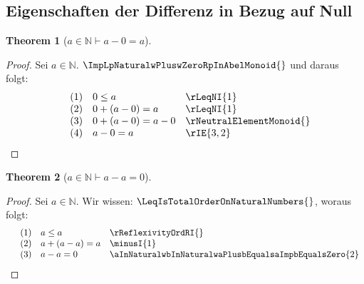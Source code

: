 \documentclass{book}
\theoremstyle{plain}
\newtheorem{theorem}{Theorem}
\theoremstyle{remark}
\theoremstyle{definition}
\begin{document}
\subsection{Eigenschaften der Differenz in Bezug auf Null}

\label{aInNaturalImpaMinusZeroEqualsa}
\begin{theorem}[\(a\in\mathbb{N}\vdash a-0=a\)]
\end{theorem}
\begin{proof}
    Sei \(a\in\mathbb{N}\). \(\ImpLpNaturalwPluswZeroRpInAbelMonoid{}\) und daraus folgt:
        \[
	\begin{array}{llll}
            &  (1) & 0\leq a & \rLeqNI{1} \\
            &  (2) & 0+(a-0)=a & \rLeqNI{1} \\
            &  (3) & 0+(a-0)=a-0 & \rNeutralElementMonoid{} \\
            &  (4) & a-0=a & \rIE{3,2} \\
    \end{array}
	\]
\end{proof}



\label{aInNaturalImpaMinusaEqualsZero}
\begin{theorem}[\(a\in\mathbb{N}\vdash a-a=0\)]
\end{theorem}
\begin{proof}
        Sei \(a\in\mathbb{N}\). Wir wissen: \(\LeqIsTotalOrderOnNaturalNumbers{}\), woraus folgt:
        \[
	\begin{array}{llll}
                &  (1) & a\leq a & \rReflexivityOrdRI{} \\
                &  (2) & a+(a-a)=a & \minusI{1} \\
                &  (3) & a-a=0 & \aInNaturalwbInNaturalwaPlusbEqualsaImpbEqualsZero{2} \\
    \end{array}
	\]
\end{proof}
\end{document}
